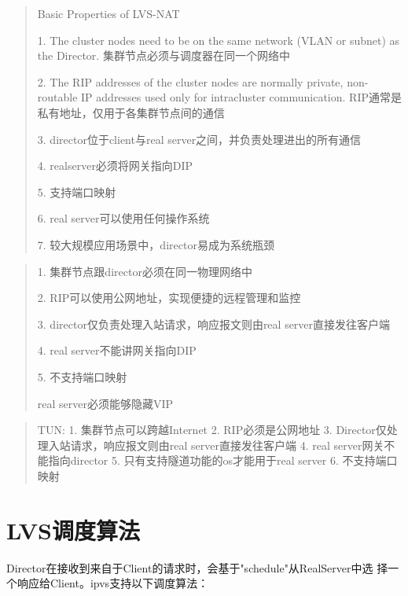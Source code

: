 \begin{quote}
  Basic Properties of LVS-NAT 

1. The cluster nodes need to be on the
same network (VLAN or subnet) as the Director.
集群节点必须与调度器在同一个网络中


2. The RIP addresses of the cluster nodes are normally private,
non-routable IP addresses used only for intracluster communication.
RIP通常是私有地址，仅用于各集群节点间的通信

3. director位于client与real server之间，并负责处理进出的所有通信

4. realserver必须将网关指向DIP

5. 支持端口映射

6. real server可以使用任何操作系统

7. 较大规模应用场景中，director易成为系统瓶颈
\end{quote}

\begin{quote}
  1. 集群节点跟director必须在同一物理网络中

  2. RIP可以使用公网地址，实现便捷的远程管理和监控

  3. director仅负责处理入站请求，响应报文则由real server直接发往客户端

  4. real server不能讲网关指向DIP

  5. 不支持端口映射

  real server必须能够隐藏VIP
\end{quote}

\begin{quote}
  TUN:
  1. 集群节点可以跨越Internet
  2. RIP必须是公网地址
  3. Director仅处理入站请求，响应报文则由real server直接发往客户端
  4. real server网关不能指向director
  5. 只有支持隧道功能的os才能用于real server
  6. 不支持端口映射
\end{quote}

\section{LVS调度算法}

Director在接收到来自于Client的请求时，会基于"schedule"从RealServer中选
择一个响应给Client。ipvs支持以下调度算法：


